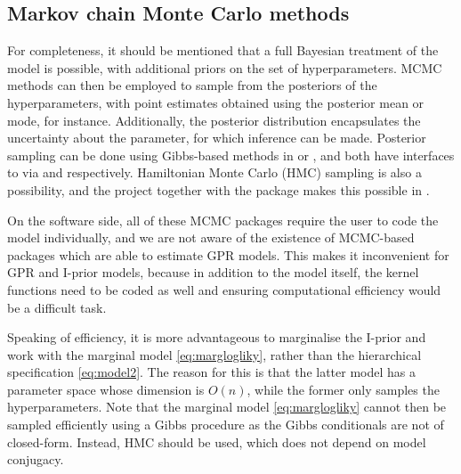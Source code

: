 

\subsection{Markov chain Monte Carlo methods}

For completeness, it should be mentioned that a full Bayesian treatment of the model is possible, with additional priors on the set of hyperparameters.
MCMC methods can then be employed to sample from the posteriors of the hyperparameters, with point estimates obtained using the posterior mean or mode, for instance.
Additionally, the posterior distribution encapsulates the uncertainty about the parameter, for which inference can be made.
Posterior sampling can be done using Gibbs-based methods in  \citep{lunn2000winbugs} or  \citep{plummer2003jags}, and both have interfaces to  via  \citep{sturtz2005r2winbugs} and  \citep{denwood2016runjags} respectively.
Hamiltonian Monte Carlo (HMC) sampling is also a possibility, and the  project \citep{carpenter2016stan} together with the package  \citep{rstan}  makes this possible in .

On the software side, all of these MCMC packages require the user to code the model individually, and we are not aware of the existence of MCMC-based packages which are able to estimate GPR models.
This makes it inconvenient for GPR and I-prior models, because in addition to the model itself, the kernel functions need to be coded as well and ensuring computational efficiency would be a difficult task.

Speaking of efficiency, it is more advantageous to marginalise the I-prior and work with the marginal model \cref{eq:marglogliky}, rather than the hierarchical specification \cref{eq:model2}.
The reason for this is that the latter model has a parameter space whose dimension is $O(n)$, while the former only samples the hyperparameters.
Note that the marginal model \cref{eq:marglogliky} cannot then be sampled efficiently using a Gibbs procedure as the Gibbs conditionals are not of closed-form.
Instead, HMC should be used, which does not depend on model conjugacy.

